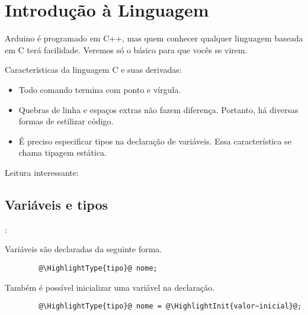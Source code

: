 
\section{Introdução à Linguagem}


\begin{frame}[b]{\insertsection}

	Arduino é programado em C++, mas quem conhecer qualquer linguagem baseada em C terá facilidade. Veremos só o básico para que vocês se virem.

	\bigskip
	Características da linguagem C e suas derivadas:
	\begin{itemize}
		\item Todo comando termina com ponto e vírgula.
		\item Quebras de linha e espaços extras não fazem diferença. Portanto, há diversas formas de estilizar código.
		\item É preciso especificar tipos na declaração de variáveis. Essa característica se chama tipagem estática.
	\end{itemize}

	\vfill
	Leitura interessante: 

\end{frame}


\subsection{Variáveis e tipos}


\begin{frame}[fragile]{\insertsection: \insertsubsection}

	Variáveis são declaradas da seguinte forma.
	\begin{verbatim}
		@\HighlightType{tipo}@ nome;
	\end{verbatim}

	Também é possível inicializar uma variável na declaração.
	\begin{verbatim}
		@\HighlightType{tipo}@ nome = @\HighlightInit{valor~inicial}@;
	\end{verbatim}

\end{frame}


